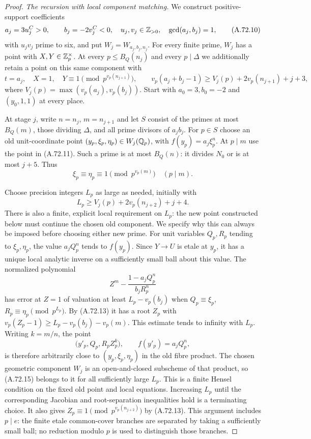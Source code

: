\begin{proof}
\emph{The recursion with local component matching.}
We construct positive-support coefficients
\[
 a_j=3u_j^C>0,\qquad b_j=-2v_j^C<0,
 \quad u_j,v_j\in\mathbb Z_{>0},\quad \gcd(a_j,b_j)=1,
\tag{A.72.10}
\]
with $u_jv_j$ prime to six, and put $W_j=W_{a_j,b_j,n_j}$.
For every finite prime, $W_j$ has a point with $X,Y\in\mathbb Z_p^\times$.
At every $p\le B_Q(n_j)$ and every $p\mid\Delta$ we additionally
retain a point on this same component with
\[
 t=a_j,\quad X=1,\quad
 Y\equiv1\pmod {p^{v_p(n_{j+1})}},\qquad
 v_p(a_j+b_j-1)\ge V_j(p)+2v_p(n_{j+1})+j+3,
\tag{A.72.11}
\]
where $V_j(p)=\max(v_p(a_j),v_p(b_j))$.
Start with $a_0=3,b_0=-2$ and $(y_0,1,1)$ at every place.

At stage $j$, write $n=n_j$, $m=n_{j+1}$ and let $S$ consist
of the primes at most $B_Q(m)$, those dividing $\Delta$, and all
prime divisors of $a_jb_j$.
For $p\in S$ choose an old unit-coordinate point
$(y_p,\xi_p,\eta_p)\in W_j(\mathbb Q_p)$, with
$f(y_p)=a_j\xi_p^n$.
At $p\mid m$ use the point in (A.72.11).
Such a prime is at most $B_Q(n)$: it divides $N_0$ or is at most
$j+5$.  Thus
\[
                   \xi_p\equiv\eta_p\equiv1
                          \pmod {p^{v_p(m)}}\quad(p\mid m).
\tag{A.72.12}
\]

Choose precision integers $L_p$ as large as needed, initially with
\[
 L_p\ge V_j(p)+2v_p(n_{j+2})+j+4.
\tag{A.72.13}
\]
There is also a finite, explicit local requirement on $L_p$:
the new point constructed below must continue the chosen old
component.  We specify why this can always be imposed before
choosing either new prime.  For unit variables $Q_p,R_p$ tending
to $\xi_p,\eta_p$, the value $a_jQ_p^n$ tends to $f(y_p)$.
Since $Y\to U$ is etale at $y_p$, it has a unique local analytic
inverse on a sufficiently small ball about this value.
The normalized polynomial
\[
 Z^m-\frac{1-a_jQ_p^n}{b_jR_p^n}
\tag{A.72.14}
\]
has error at $Z=1$ of valuation at least $L_p-v_p(b_j)$ when
$Q_p\equiv\xi_p$, $R_p\equiv\eta_p\pmod {p^{L_p}}$.
By (A.72.13) it has a root $Z_p$ with
$v_p(Z_p-1)\ge L_p-v_p(b_j)-v_p(m)$.
This estimate tends to infinity with $L_p$.
Writing $k=m/n$, the point
\[
 \bigl(y'_p,Q_p,R_pZ_p^k\bigr),\qquad
                         f(y'_p)=a_jQ_p^n,
\tag{A.72.15}
\]
is therefore arbitrarily close to
$(y_p,\xi_p,\eta_p)$ in the old fibre product.
The chosen geometric component $W_j$ is an open-and-closed
subscheme of that product, so (A.72.15) belongs to it for all
sufficiently large $L_p$.
This is a finite Hensel condition on the fixed old point and
local equations.  Increasing $L_p$ until the corresponding
Jacobian and root-separation inequalities hold is a terminating
choice.  It also gives
$Z_p\equiv1\pmod {p^{v_p(n_{j+2})}}$ by (A.72.13).
This argument includes $p\mid e$: the finite etale common-cover
branches are separated by taking a sufficiently small ball;
no reduction modulo $p$ is used to distinguish those branches.


\end{proof}
